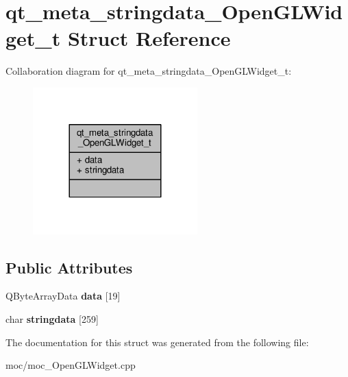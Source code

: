 \hypertarget{structqt__meta__stringdata___open_g_l_widget__t}{\section{qt\-\_\-meta\-\_\-stringdata\-\_\-\-Open\-G\-L\-Widget\-\_\-t Struct Reference}
\label{structqt__meta__stringdata___open_g_l_widget__t}
}


Collaboration diagram for qt\-\_\-meta\-\_\-stringdata\-\_\-\-Open\-G\-L\-Widget\-\_\-t\-:
\nopagebreak
\begin{figure}[H]
\begin{center}
\leavevmode
\includegraphics[width=180pt]{structqt__meta__stringdata___open_g_l_widget__t__coll__graph}
\end{center}
\end{figure}
\subsection*{Public Attributes}
\begin{DoxyCompactItemize}
\item 
\hypertarget{structqt__meta__stringdata___open_g_l_widget__t_a93478c21ac7ab09673e337f350605336}{Q\-Byte\-Array\-Data {\bfseries data} \mbox{[}19\mbox{]}}\label{structqt__meta__stringdata___open_g_l_widget__t_a93478c21ac7ab09673e337f350605336}

\item 
\hypertarget{structqt__meta__stringdata___open_g_l_widget__t_a53f7fd5bb4e6c02bfc428fc9bae29f99}{char {\bfseries stringdata} \mbox{[}259\mbox{]}}\label{structqt__meta__stringdata___open_g_l_widget__t_a53f7fd5bb4e6c02bfc428fc9bae29f99}

\end{DoxyCompactItemize}


The documentation for this struct was generated from the following file\-:\begin{DoxyCompactItemize}
\item 
moc/moc\-\_\-\-Open\-G\-L\-Widget.\-cpp\end{DoxyCompactItemize}
